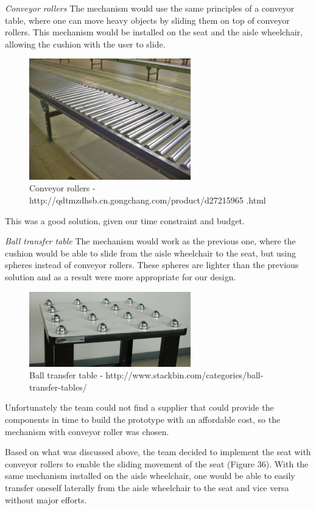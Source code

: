 \emph{Conveyor rollers}
The mechanism would use the same principles of a conveyor table, where one can move heavy objects by sliding them on top of conveyor rollers. This mechanism would be installed on the seat and the aisle wheelchair, allowing the cushion with the user to slide.

\begin{figure}[h]
\centering
\includegraphics[width=7cm]{brazil_images/image036.jpg}
\caption{Conveyor rollers - http://qdtmzdhsb.cn.gongchang.com/product/d27215965
.html}
\label{fig:conveyor_rollers}
\end{figure}
 
This was a good solution, given our time constraint and budget.

\emph{Ball transfer table}
The mechanism would work as the previous one, where the cushion would be able to slide from the aisle wheelchair to the seat, but using spheres instead of conveyor rollers. These spheres are lighter than the previous solution and as a result were more appropriate for our design.

\begin{figure}[h]
\centering
\includegraphics[width=7cm]{brazil_images/image037.jpg}
\caption{Ball transfer table -  http://www.stackbin.com/categories/ball-
transfer-tables/ }
\label{fig:ball_transfer}
\end{figure}

Unfortunately the team could not find a supplier that could provide the components in time to build the prototype with an affordable cost, so the mechanism with conveyor roller was chosen.

Based on what was discussed above, the team decided to implement the seat with conveyor rollers to enable the sliding movement of the seat (Figure 36). With the same mechanism installed on the aisle wheelchair, one would be able to easily transfer oneself laterally from the aisle wheelchair to the seat and vice versa without major efforts.

